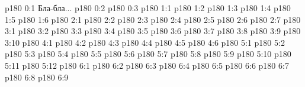\author{Промежуточные создания}
\vs p180 0:1  Бла-бла...
\vs p180 0:2 
\vs p180 0:3 
\vs p180 1:1 
\vs p180 1:2 
\vs p180 1:3 
\vs p180 1:4 
\vs p180 1:5 \pc 
\vs p180 1:6 
\vs p180 2:1 
\vs p180 2:2 
\vs p180 2:3 
\vs p180 2:4 
\vs p180 2:5 
\vs p180 2:6 
\vs p180 2:7 
\vs p180 3:1 
\vs p180 3:2 
\vs p180 3:3 
\vs p180 3:4 
\vs p180 3:5 
\vs p180 3:6 
\vs p180 3:7 
\vs p180 3:8 
\vs p180 3:9 
\vs p180 3:10 
\vs p180 4:1 
\vs p180 4:2 
\vs p180 4:3 
\vs p180 4:4 
\vs p180 4:5 
\vs p180 4:6 
\vs p180 5:1 
\vs p180 5:2 
\vs p180 5:3 
\vs p180 5:4 
\vs p180 5:5 
\vs p180 5:6 
\vs p180 5:7 
\vs p180 5:8 
\vs p180 5:9 
\vs p180 5:10 
\vs p180 5:11 
\vs p180 5:12 
\vs p180 6:1 
\vs p180 6:2 
\vs p180 6:3 
\vs p180 6:4 
\vs p180 6:5 
\vs p180 6:6 
\vs p180 6:7 
\vs p180 6:8 
\vs p180 6:9 
\quizlink
